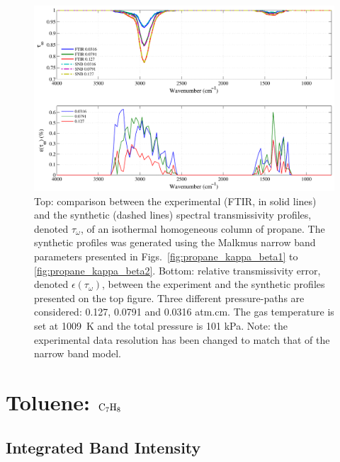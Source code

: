 \begin{figure}[p]
\includegraphics[width=\textwidth]{Figures/Comparison_Fit_Propane_MALKMUS_Temp1009K.pdf}
\caption{Top: comparison between the experimental (FTIR, in solid lines) and the synthetic (dashed lines) spectral transmissivity profiles, denoted $\tau_{\omega}$, of an isothermal homogeneous column of propane. The synthetic profiles was generated using the Malkmus narrow band parameters presented in Figs.~\ref{fig:propane_kappa_beta1} to \ref{fig:propane_kappa_beta2}. Bottom: relative transmissivity error, denoted $\epsilon{(\tau_{\omega})}$, between the experiment and the synthetic profiles presented on the top figure. Three different pressure-paths are considered: 0.127, 0.0791 and 0.0316 atm.cm. The gas temperature is set at 1009~K and the total pressure is 101 kPa. Note: the experimental data resolution has been changed to match that of the narrow band model. \label{fig:propane_SNBVerify_1009K}}
\end{figure}


\clearpage

\section{Toluene: $\rm C_7H_8$}

\subsection{Integrated Band Intensity}

